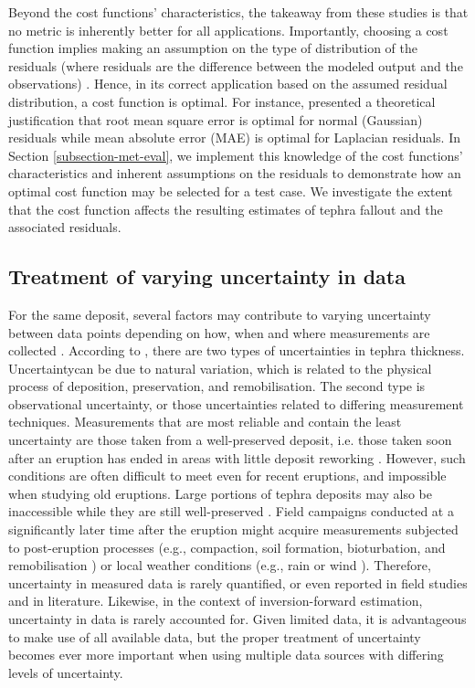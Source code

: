 \documentclass[a4paper,fleqn]{cas-sc}
\begin{document}
    Beyond the cost functions' characteristics, the takeaway from these studies is that no metric is inherently better for all applications. Importantly, choosing a cost function implies making an assumption on the type of distribution of the residuals (where residuals are the difference between the modeled output and the observations) \citep{engle1993limitations}. Hence, in its correct application based on the assumed residual distribution, a cost function is optimal. For instance, \cite{hodson2022root} presented a theoretical justification that root mean square error is optimal for normal (Gaussian) residuals while mean absolute error (MAE) is optimal for Laplacian residuals. In Section \ref{subsection-met-eval}, we implement this knowledge of the cost functions' characteristics and inherent assumptions on the residuals to demonstrate how an optimal cost function may be selected for a test case. We investigate the extent that the cost function affects the resulting estimates of tephra fallout and the associated residuals. 

 
\subsection{Treatment of varying uncertainty in data} \label{subsection-tephra2-uncertainty}
    For the same deposit, several factors may contribute to varying uncertainty between data points depending on how, when and where measurements are collected \citep{engwell2013, bonadonna2015}. According to \cite{engwell2013}, there are two types of uncertainties in tephra thickness. Uncertaintycan be due to natural variation, which is related to the physical process of deposition, preservation, and remobilisation. The second type is observational uncertainty, or those uncertainties related to differing measurement techniques. Measurements that are most reliable and contain the least uncertainty are those taken from a  well-preserved deposit, i.e. those taken soon after an eruption has ended in areas with little deposit reworking \citep{PYLE201625, blong2017}. However, such conditions are often difficult to meet even for recent eruptions, and impossible when studying old eruptions. Large portions of tephra deposits may also be inaccessible while they are still well-preserved \citep{walker1971characteristics}. Field campaigns conducted at a significantly later time after the eruption might acquire measurements subjected to post-eruption processes (e.g., compaction, soil formation, bioturbation, and remobilisation \citep{engwell2013}) or local weather conditions (e.g., rain or wind \citep{hayes2002, wilson2011, arnalds2013, blong2017, oishi2018, dominguez2020}). Therefore, uncertainty in measured data is rarely quantified, or even reported in field studies and in literature. Likewise, in the context of inversion-forward estimation, uncertainty in data is rarely accounted for. Given limited data, it is advantageous to make use of all available data, but the proper treatment of uncertainty becomes ever more important when using multiple data sources with differing levels of uncertainty.
\end{document}
